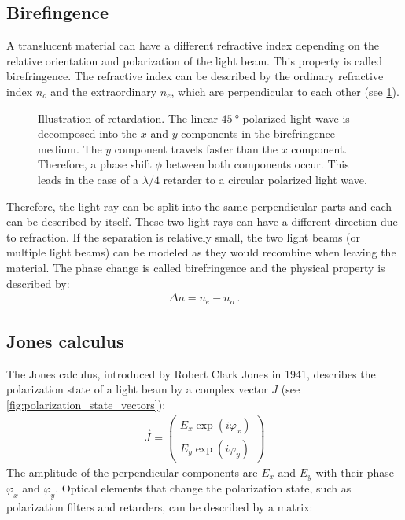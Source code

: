 \subsection{Birefingence}
%
A translucent material can have a different refractive index depending on the relative orientation and polarization of the light beam.
This property is called birefringence.
The refractive index can be described by the ordinary refractive index $n_o$ and the extraordinary $n_e$, which are perpendicular to each other (see \cref{fig:optic_retardation}).
%
\begin{figure}[!t]
\centering
\setlength{\tikzwidth}{\textwidth}
\caption{Illustration of retardation. The linear $\SI{45}{\degree}$ polarized light wave is decomposed into the $x$ and $y$ components in the birefringence medium. The $y$ component travels faster than the $x$ component. Therefore, a phase shift $\phi$ between both components occur. This leads in the case of a $\lambda/4$ retarder to a circular polarized light wave.}
\label{fig:optic_retardation}
\end{figure}
% 
Therefore, the light ray can be split into the same perpendicular parts and each can be described by itself.
These two light rays can have a different direction due to refraction.
If the separation is relatively small, the two light beams (or multiple light beams) can be modeled as they would recombine when leaving the material.
The phase change is called birefringence and the physical property is described by:
%
\begin{align}
    \Delta n = n_e - n_o \> .
\end{align}
%
%
%
\subsection{Jones calculus}
\label{sec:jones}
% 
The Jones calculus, introduced by Robert Clark Jones in 1941, describes the polarization state of a light beam by a complex vector $J$ (see \cref{fig:polarization_state_vectors}):
%
\begin{align}
    \vec{J} = \begin{pmatrix} E_x \exp(i \varphi_x) \\ E_y \exp(i \varphi_y) \end{pmatrix}
\end{align}
%
The amplitude of the perpendicular components are $E_x$ and $E_y$ with their phase $\varphi_x$ and $\varphi_y$.
Optical elements that change the polarization state, such as polarization filters and retarders, can be described by a matrix:
%
